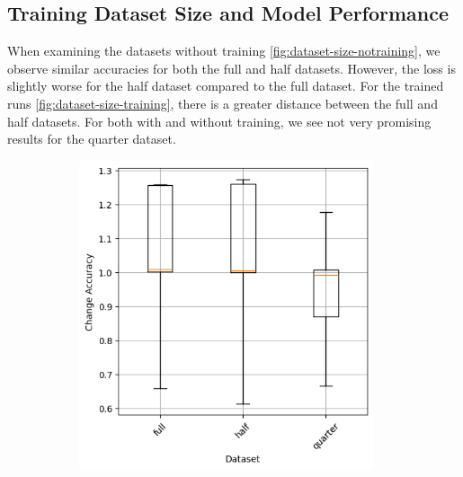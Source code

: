 \subsection{Training Dataset Size and Model Performance}\label{subsec:training-dataset-size-and-model-performance}
When examining the datasets without training \ref{fig:dataset-size-notraining}, we observe similar accuracies for both the full and half datasets.
However, the loss is slightly worse for the half dataset compared to the full dataset.
For the trained runs \ref{fig:dataset-size-training}, there is a greater distance between the full and half datasets.
For both with and without training, we see not very promising results for the quarter dataset.
\begin{figure}
    \begin{subfigure}{0.5\textwidth}
        \centering
        \includegraphics[width=0.95\textwidth]{plots/Dataset_NotTrained_accuracy.png}
    \end{subfigure}
    \begin{subfigure}{0.5\textwidth}
        \centering

\end{subfigure}
\end{figure}
